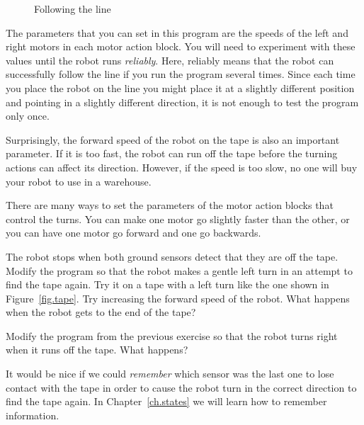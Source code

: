 
\begin{figure}
\begin{center}
\caption{Following the line}\label{fig.follow-line}
\end{center}
\end{figure}

The parameters that you can set in this program are the speeds of the
left and right motors in each motor action block. You will need to
experiment with these values until the robot runs \emph{reliably}. Here,
reliably means that the robot can successfully follow the line if you
run the program several times. Since each time you place the robot on
the line you might place it at a slightly different position and
pointing in a slightly different direction, it is not enough to test the
program only once.

Surprisingly, the forward speed of the robot on the tape is also an
important parameter. If it is too fast, the robot can run off the tape
before the turning actions can affect its direction. However, if the
speed is too slow, no one will buy your robot to use in a warehouse.

There are many ways to set the parameters of the motor action blocks
that control the turns. You can make one motor go slightly faster than
the other, or you can have one motor go forward and one go backwards.


The robot stops when both ground sensors detect that they are off the
tape. Modify the program so that the robot makes a gentle left turn in
an attempt to find the tape again. Try it on a tape with a left turn
like the one shown in Figure~\ref{fig.tape}. Try increasing the forward
speed of the robot. What happens when the robot gets to the end of the
tape?


Modify the program from the previous exercise so that
the robot turns right when it runs off the tape. What happens?

It would be nice if we could \emph{remember} which sensor was the last
one to lose contact with the tape in order to cause the robot turn in
the correct direction to find the tape again. In Chapter~\ref{ch.states}
we will learn how to remember information.

